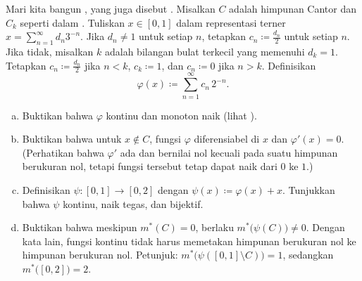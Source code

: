 \begin{samepage}
\begin{exercise}[Menantang]
Mari kita bangun \emph{}, yang juga disebut
\emph{}. Misalkan $C$ adalah himpunan Cantor dan $C_k$
seperti dalam . Tuliskan $x\in[0,1]$ dalam
representasi terner
$x=\sum_{n=1}^{\infty}d_n3^{-n}$. Jika $d_n\neq1$ untuk setiap $n$, tetapkan
$c_n\coloneqq\frac{d_n}{2}$ untuk setiap $n$. Jika tidak, misalkan $k$ adalah
bilangan bulat terkecil yang memenuhi $d_k=1$. Tetapkan
$c_n\coloneqq\frac{d_n}{2}$ jika $n<k$, $c_k\coloneqq1$, dan
$c_n\coloneqq0$ jika $n>k$. Definisikan
\begin{equation*}
\varphi(x) \coloneqq \sum_{n=1}^\infty c_n \, 2^{-n} .
\end{equation*}
\begin{enumerate}[a)]
\item
Buktikan bahwa $\varphi$ kontinu dan monoton naik (lihat
).
\item
Buktikan bahwa untuk $x\notin C$, fungsi $\varphi$ diferensiabel di $x$ dan
$\varphi'(x)=0$. (Perhatikan bahwa $\varphi'$ ada dan bernilai nol kecuali pada
suatu himpunan berukuran nol, tetapi fungsi tersebut tetap dapat naik dari $0$
ke $1$.)
\item
Definisikan $\psi\colon[0,1]\to[0,2]$ dengan
$\psi(x)\coloneqq\varphi(x)+x$. Tunjukkan bahwa $\psi$ kontinu, naik tegas, dan
bijektif.
\item
Buktikan bahwa meskipun $m^*(C)=0$, berlaku
$m^*\bigl(\psi(C)\bigr)\neq0$. Dengan kata lain, fungsi kontinu tidak harus
memetakan himpunan berukuran nol ke himpunan berukuran nol. Petunjuk:
$m^*\bigl(\psi([0,1]\setminus C)\bigr)=1$, sedangkan
$m^*\bigl([0,2]\bigr)=2$.
\end{enumerate}
\end{exercise}
\end{samepage}

\begin{myfigureht}
\caption{Fungsi Cantor atau tangga Iblis (fungsi $\varphi$ dari latihan).
\label{fig:cantorfunction}}
\end{myfigureht}

